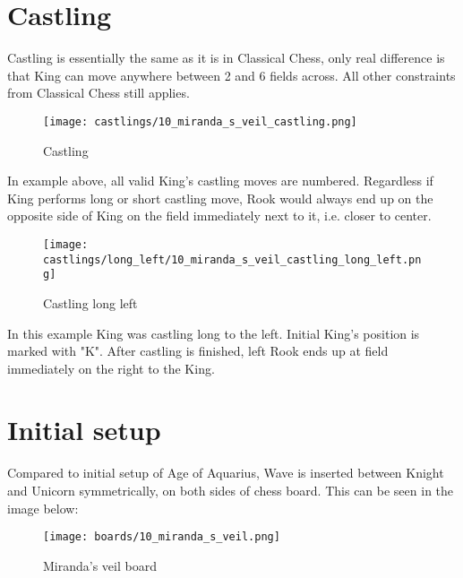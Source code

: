 \section*{Castling}

Castling is essentially the same as it is in Classical Chess, only real difference is that
King can move anywhere between 2 and 6 fields across. All other constraints from Classical Chess
still applies.

\noindent
\begin{figure}[!h]
\texttt{[image: castlings/10\_miranda\_s\_veil\_castling.png]}
\caption{Castling}
\label{fig:10_miranda_s_veil_castling}
\end{figure}

In example above, all valid King's castling moves are numbered. Regardless if King performs
long or short castling move, Rook would always end up on the opposite side of King on the
field immediately next to it, i.e. closer to center.

\noindent
\begin{figure}[!h]
\texttt{[image: castlings/long\_left/10\_miranda\_s\_veil\_castling\_long\_left.png]}
\caption{Castling long left}
\label{fig:10_miranda_s_veil_castling_long_left}
\end{figure}

In this example King was castling long to the left. Initial King's position is marked with "K".
After castling is finished, left Rook ends up at field immediately on the right to the King.

\clearpage %

\section*{Initial setup}

Compared to initial setup of Age of Aquarius, Wave is inserted between Knight and Unicorn
symmetrically, on both sides of chess board. This can be seen in the image below:

\noindent
\begin{figure}[h]
\texttt{[image: boards/10\_miranda\_s\_veil.png]}
\caption{Miranda's veil board}
\label{fig:10_miranda_s_veil}
\end{figure}

\clearpage %
